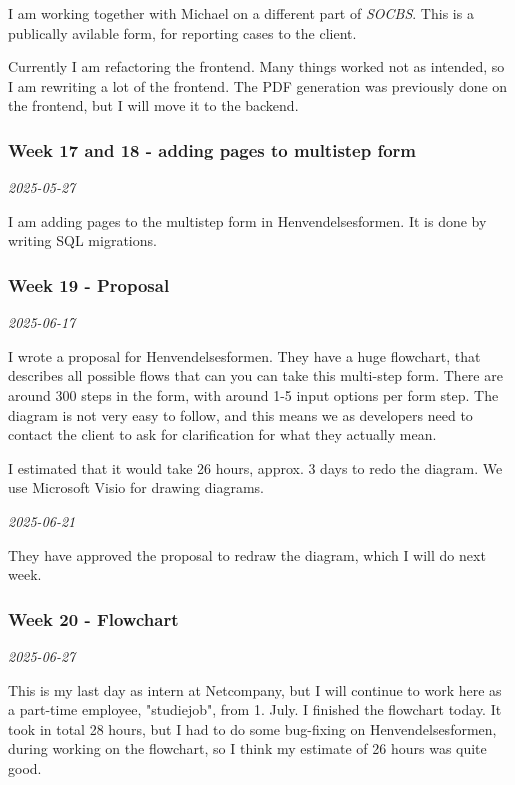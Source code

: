 \documentclass[../main.tex]{subfiles}
\begin{document}
I am working together with Michael on a different part of \textit{SOCBS}. This is a publically avilable form, for reporting cases to the client. 

Currently I am refactoring the frontend. Many things worked not as intended, so I am rewriting a lot of the frontend. The PDF generation was previously done on the frontend, but I will move it to the backend.

\subsubsection{Week 17 and 18 - adding pages to multistep form}

\noindent \textit{2025-05-27}
\smallskip

I am adding pages to the multistep form in Henvendelsesformen. It is done by writing SQL migrations. 

\subsubsection{Week 19 - Proposal}

\noindent \textit{2025-06-17}
\smallskip

I wrote a proposal for Henvendelsesformen. They have a huge flowchart, that describes all possible flows that can you can take this multi-step form. There are around 300 steps in the form, with around 1-5 input options per form step. The diagram is not very easy to follow, and this means we as developers need to contact the client to ask for clarification for what they actually mean. 

I estimated that it would take 26 hours, approx. 3 days to redo the diagram. We use Microsoft Visio for drawing diagrams.


\bigskip
\noindent \textit{2025-06-21}
\smallskip

They have approved the proposal to redraw the diagram, which I will do next week.

\subsubsection{Week 20 - Flowchart}

\noindent \textit{2025-06-27}
\smallskip

This is my last day as intern at Netcompany, but I will continue to work here as a part-time employee, "studiejob", from 1. July.  I finished the flowchart today. It took in total 28 hours, but I had to do some bug-fixing on Henvendelsesformen, during working on the flowchart, so I think my estimate of 26 hours was quite good. 
\end{document}
